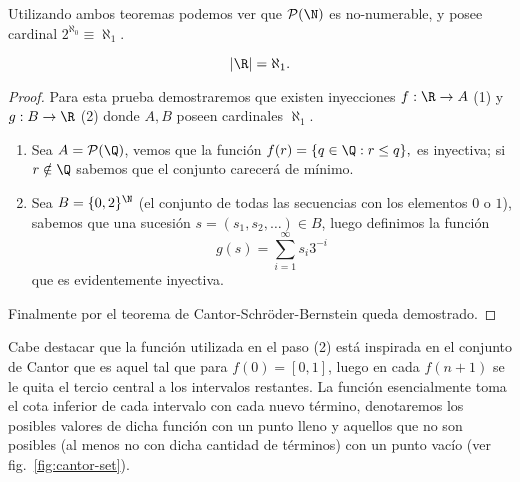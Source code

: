 \documentclass[11pt,oneside,a4paper]{book}
\renewcommand{\P}{\mathcal{P}}
\begin{document}
Utilizando ambos teoremas podemos ver que $\P(\N)$ es no-numerable, y posee cardinal $2^{\aleph_0}\equiv\aleph_1$.
\begin{thm}
$$|\R|=\aleph_1.$$
\end{thm}
\begin{proof}
Para esta prueba demostraremos que existen inyecciones $f:\R\rightarrow A$ (1) y $g:B\rightarrow\R$ (2) donde $A,B$ poseen cardinales $\aleph_1$.
\begin{enumerate}[(1)]
\item Sea $A=\P(\Q)$, vemos que la función
$f(r)=\{q\in\Q:r\leq q\},$
es inyectiva; si $r\notin\Q$ sabemos que el conjunto carecerá de mínimo.
\item Sea $B=\{0,2\}^\N$ (el conjunto de todas las secuencias con los elementos $0$ o $1$), sabemos que una sucesión $s=(s_1,s_2,\dots)\in B$, luego definimos la función
$$g(s)=\sum_{i=1}^\infty s_i 3^{-i}$$
que es evidentemente inyectiva.
\end{enumerate}
Finalmente por el teorema de Cantor-Schröder-Bernstein queda demostrado.
\end{proof}
Cabe destacar que la función utilizada en el paso (2) está inspirada en el conjunto de Cantor que es aquel tal que para $f(0)=[0,1]$, luego en cada $f(n+1)$ se le quita el tercio central a los intervalos restantes. La función esencialmente toma el cota inferior de cada intervalo con cada nuevo término, denotaremos los posibles valores de dicha función con un punto lleno y aquellos que no son posibles (al menos no con dicha cantidad de términos) con un punto vacío (ver fig.~\ref{fig:cantor-set}).
\end{document}

